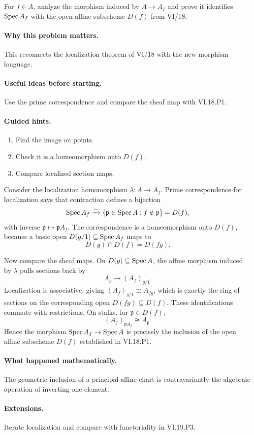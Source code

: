 \begin{problem}\label{prob:vi19-p07}
For $f\in A$, analyze the morphism induced by $A\to A_f$ and prove it identifies $\operatorname{Spec} A_f$ with the open affine subscheme $D(f)$ from VI/18.
\end{problem}

\ifdefined\FullProblemDossiers
\paragraph{Why this problem matters.}
This reconnects the localization theorem of VI/18 with the new morphism language.

\paragraph{Useful ideas before starting.}
Use the prime correspondence and compare the sheaf map with VI.18.P1.

\paragraph{Guided hints.}
\begin{enumerate}
\item Find the image on points.
\item Check it is a homeomorphism onto $D(f)$.
\item Compare localized section maps.
\end{enumerate}

\begin{solution}
Consider the localization homomorphism \(\lambda:A\to A_f\).  Prime correspondence for localization says that contraction defines a bijection
\[
\operatorname{Spec} A_f\xrightarrow{\sim}\{\mathfrak p\in\operatorname{Spec} A:f\notin\mathfrak p\}=D(f),
\]
with inverse \(\mathfrak p\mapsto\mathfrak pA_f\).  The correspondence is a homeomorphism onto \(D(f)\), because a basic open \(D(g/1)\subseteq\operatorname{Spec} A_f\) maps to
\[
D(g)\cap D(f)=D(fg).
\]

Now compare the sheaf maps.  On \(D(g)\subseteq\operatorname{Spec} A\), the affine morphism induced by \(\lambda\) pulls sections back by
\[
A_g\longrightarrow(A_f)_{g/1}.
\]
Localization is associative, giving \((A_f)_{g/1}\cong A_{fg}\), which is exactly the ring of sections on the corresponding open \(D(fg)\subseteq D(f)\).  These identifications commute with restrictions.  On stalks, for \(\mathfrak p\in D(f)\),
\[
(A_f)_{\mathfrak pA_f}\cong A_{\mathfrak p}.
\]
Hence the morphism \(\operatorname{Spec} A_f\to\operatorname{Spec} A\) is precisely the inclusion of the open affine subscheme \(D(f)\) established in VI.18.P1.
\end{solution}

\paragraph{What happened mathematically.}
The geometric inclusion of a principal affine chart is contravariantly the algebraic operation of inverting one element.

\paragraph{Extensions.}
Iterate localization and compare with functoriality in VI.19.P3.
\fi
